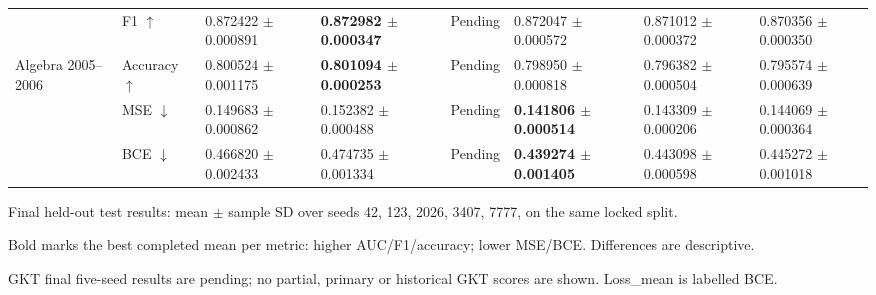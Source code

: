 \begin{table}[htbp]
{\begin{tabular}{llllllll}
 & F1 $\uparrow$ & 0.872422 $\pm$ 0.000891 & \textbf{0.872982 $\pm$ 0.000347} & Pending & 0.872047 $\pm$ 0.000572 & 0.871012 $\pm$ 0.000372 & 0.870356 $\pm$ 0.000350 \\
Algebra 2005--2006 & Accuracy $\uparrow$ & 0.800524 $\pm$ 0.001175 & \textbf{0.801094 $\pm$ 0.000253} & Pending & 0.798950 $\pm$ 0.000818 & 0.796382 $\pm$ 0.000504 & 0.795574 $\pm$ 0.000639 \\
 & MSE $\downarrow$ & 0.149683 $\pm$ 0.000862 & 0.152382 $\pm$ 0.000488 & Pending & \textbf{0.141806 $\pm$ 0.000514} & 0.143309 $\pm$ 0.000206 & 0.144069 $\pm$ 0.000364 \\
 & BCE $\downarrow$ & 0.466820 $\pm$ 0.002433 & 0.474735 $\pm$ 0.001334 & Pending & \textbf{0.439274 $\pm$ 0.001405} & 0.443098 $\pm$ 0.000598 & 0.445272 $\pm$ 0.001018 \\
\bottomrule
\end{tabular}}
\begin{minipage}{\textwidth}\footnotesize
Final held-out test results: mean $\pm$ sample SD over seeds 42, 123, 2026, 3407, 7777, on the same locked split.\par Bold marks the best completed mean per metric: higher AUC/F1/accuracy; lower MSE/BCE. Differences are descriptive.\par GKT final five-seed results are pending; no partial, primary or historical GKT scores are shown. Loss\_mean is labelled BCE.
\end{minipage}
\end{table}
